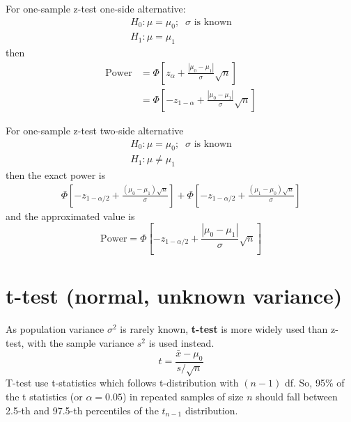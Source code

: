 For one-sample z-test one-side alternative:
\begin{equation*}
  \begin{split}
    H_0: \mu = \mu_0;\;\; \sigma \text{ is known}\\
    H_1: \mu = \mu_1 
  \end{split}
\end{equation*}
then
\begin{equation}
  \label{eq:71}
  \begin{split}
    \text{Power} &= \Phi[z_\alpha + \frac{|\mu_0-\mu_1|}{\sigma}\sqrt{n}]
    \\
    &= \Phi[-z_{1-\alpha} + \frac{|\mu_0-\mu_1|}{\sigma}\sqrt{n}]
  \end{split}
\end{equation}

For one-sample z-test two-side alternative
\begin{equation*}
  \begin{split}
    H_0: \mu = \mu_0;\;\; \sigma \text{ is known}\\
    H_1: \mu \ne \mu_1 
  \end{split}
\end{equation*}
then the exact power is
\begin{equation}
  \label{eq:63}
  \begin{split}
    \Phi\left[-z_{1-\alpha/2}+\frac{(\mu_0-\mu_1)\sqrt{n}}{\sigma}\right]+
    \Phi\left[-z_{1-\alpha/2}+\frac{(\mu_1-\mu_0)\sqrt{n}}{\sigma}\right]
  \end{split}
\end{equation}
and the approximated value is
\begin{equation}
  \label{eq:72}
  \text{Power} = \Phi[-z_{1-\alpha/2} + \frac{|\mu_0-\mu_1|}{\sigma}\sqrt{n}]
\end{equation}


\section{t-test (normal, unknown variance)}
\label{sec:t-test}

As population variance $\sigma^2$ is rarely known, {\bf t-test} is
more widely used than z-test, with the sample variance $s^2$ is used
instead.
\begin{equation}
  \label{eq:75}
  t = \frac{\bar{x} - \mu_0}{s/\sqrt{n}}
\end{equation}
T-test use t-statistics which follows t-distribution with $(n-1)$
df. So, 95\% of the t statistics (or $\alpha=0.05$) in repeated
samples of size $n$ should fall between 2.5-th and 97.5-th percentiles
of the $t_{n-1}$ distribution.


